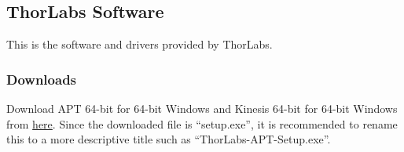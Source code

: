 \documentclass[11pt, letterpaper, titlepage]{article}
\begin{document}
\subsection{ThorLabs Software} \label{thorlabssoftware} %
This is the software and drivers provided by ThorLabs.
\subsubsection{Downloads} %
Download APT 64-bit for 64-bit Windows and Kinesis 64-bit for 64-bit Windows from \href{https://www.thorlabs.com/software_pages/ViewSoftwarePage.cfm?Code=Motion_Control}{here}.
Since the downloaded file is ``setup.exe'', it is recommended to rename this to a more descriptive title such as ``ThorLabs-APT-Setup.exe''.
\end{document}
